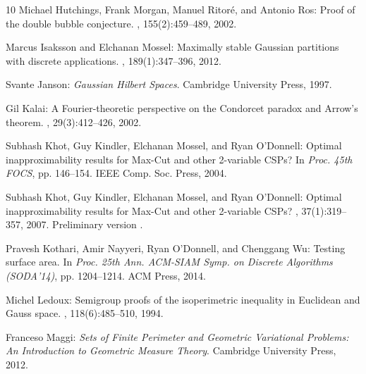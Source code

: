 \documentclass[11pt]{article}
\numberwithin{equation}{section}
\theoremstyle{definition}
\theoremstyle{plain}
\begin{document}
\begin{thebibliography}{10}
{\sc Michael Hutchings, Frank Morgan, Manuel Ritor{\'e}, and Antonio Ros}:
  Proof of the double bubble conjecture.
, 155(2):459--489, 2002.

{\sc Marcus Isaksson and Elchanan Mossel}: Maximally stable {G}aussian
  partitions with discrete applications.
, 189(1):347--396, 2012.

{\sc Svante Janson}: {\em Gaussian {H}ilbert {S}paces}.
\newblock Cambridge University Press, 1997.

{\sc Gil Kalai}: {A Fourier-theoretic perspective on the Condorcet paradox and
  Arrow's theorem}.
, 29(3):412--426, 2002.
\newblock [\epfmtdoi{10.1016/S0196-8858(02)00023-4}]

{\sc Subhash Khot, Guy Kindler, Elchanan Mossel, and Ryan O'Donnell}: Optimal
  inapproximability results for {Max-Cut} and other 2-variable {CSPs}?
\newblock In {\em Proc. 45th FOCS}, pp. 146--154. IEEE Comp. Soc. Press, 2004.

{\sc Subhash Khot, Guy Kindler, Elchanan Mossel, and Ryan O'Donnell}: Optimal
  inapproximability results for {Max-Cut} and other 2-variable {CSPs}?
, 37(1):319--357, 2007.
\newblock Preliminary version \cite{KKMO04}.
\newblock [\epfmtdoi{10.1137/S0097539705447372}]

{\sc Pravesh Kothari, Amir Nayyeri, Ryan O'Donnell, and Chenggang Wu}: Testing
  surface area.
\newblock In {\em Proc. 25th Ann. ACM-SIAM Symp. on Discrete Algorithms
  (SODA'14)}, pp. 1204--1214. ACM Press, 2014.
\newblock [\epfmtdoi{10.1137/1.9781611973402.89}]

{\sc Michel Ledoux}: Semigroup proofs of the isoperimetric inequality in
  {E}uclidean and {G}auss space.
, 118(6):485--510, 1994.

{\sc Franceso Maggi}: {\em Sets of Finite Perimeter and Geometric Variational
  Problems: An Introduction to {G}eometric {M}easure {T}heory}.
\newblock Cambridge University Press, 2012.


\end{thebibliography}
\end{document}
